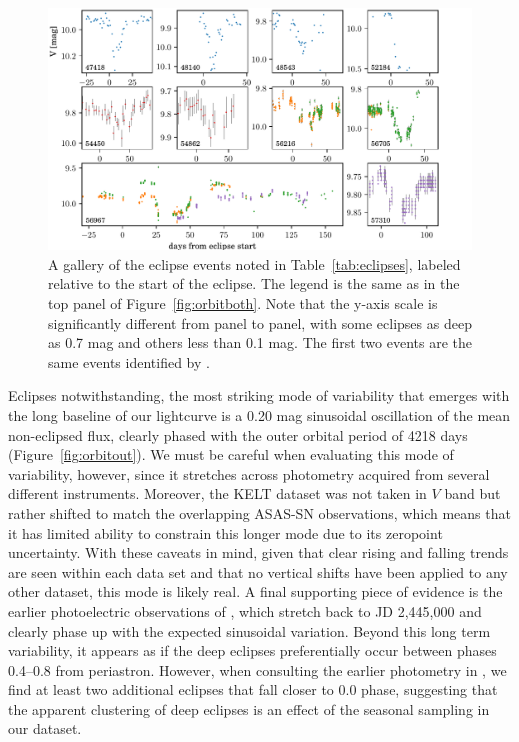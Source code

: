 \documentclass[twocolumn]{aastex61}
\begin{document}
\begin{figure}[!ht]
\includegraphics{eclipse-gallery.pdf}
\caption{A gallery of the eclipse events noted in Table~\ref{tab:eclipses}, labeled relative to the start of the eclipse. The legend is the same as in the top panel of Figure~\ref{fig:orbitboth}. Note that the y-axis scale is significantly different from panel to panel, with some eclipses as deep as 0.7 mag and others less than 0.1 mag. The first two events are the same events identified by \citet{shevchenko92}.}
\label{fig:eclipse-gallery}
\end{figure}

Eclipses notwithstanding, the most striking mode of variability that emerges with the long baseline of our lightcurve is a 0.20 mag sinusoidal oscillation of the mean non-eclipsed flux, clearly phased with the outer orbital period of 4218 days (Figure~\ref{fig:orbitout}). We must be careful when evaluating this mode of variability, however, since it stretches across photometry acquired from several different instruments. Moreover, the KELT dataset was not taken in $V$ band but rather shifted to match the overlapping ASAS-SN observations, which means that it has limited ability to constrain this longer mode due to its zeropoint uncertainty. With these caveats in mind, given that clear rising and falling trends are seen within each data set and that no vertical shifts have been applied to any other dataset, this mode is likely real. A final supporting piece of evidence is the earlier photoelectric observations of \citet{shevchenko98}, which stretch back to JD 2,445,000 and clearly phase up with the expected sinusoidal variation.
Beyond this long term variability, it appears as if the deep eclipses preferentially occur between phases 0.4--0.8 from periastron. However, when consulting the earlier photometry in \citet{shevchenko98}, we find at least two additional eclipses that fall closer to 0.0 phase, suggesting that the apparent clustering of deep eclipses is an effect of the seasonal sampling in our dataset.
\end{document}
